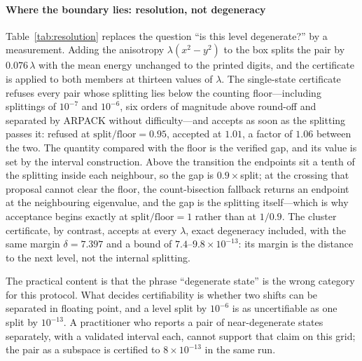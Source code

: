 \paragraph{Where the boundary lies: resolution, not degeneracy}
Table~\ref{tab:resolution} replaces the question ``is this level degenerate?''
by a measurement. Adding the anisotropy $\lambda(x^2-y^2)$ to the box splits
the pair by $0.076\,\lambda$ with the mean energy unchanged to the printed
digits, and the certificate is applied to both members at thirteen values of
$\lambda$. The single-state certificate refuses every pair whose splitting
lies below the counting floor---including splittings of $10^{-7}$ and
$10^{-6}$, six orders of magnitude above round-off and separated by ARPACK
without difficulty---and accepts as soon as the splitting passes it: refused
at $\text{split}/\text{floor}=0.95$, accepted at $1.01$, a factor of $1.06$
between the two. The quantity compared with the floor is the verified gap,
and its value is set by the interval construction. Above the transition the
endpoints sit a tenth of the splitting inside each neighbour, so the gap is
$0.9\times$split; at the crossing that proposal cannot clear the floor, the
count-bisection fallback returns an endpoint at the neighbouring eigenvalue,
and the gap is the splitting itself---which is why acceptance begins exactly
at $\text{split}/\text{floor}=1$ rather than at $1/0.9$. The cluster
certificate, by contrast, accepts at every $\lambda$, exact degeneracy
included, with the same margin $\delta=7.397$ and a bound of
$7.4$--$9.8\times10^{-13}$: its margin is the distance to the next level, not
the internal splitting.

The practical content is that the phrase ``degenerate state'' is the wrong
category for this protocol. What decides certifiability is whether two shifts
can be separated in floating point, and a level split by $10^{-6}$ is as
uncertifiable as one split by $10^{-13}$. A practitioner who reports a pair of
near-degenerate states separately, with a validated interval each, cannot
support that claim on this grid; the pair as a subspace is certified to
$8\times10^{-13}$ in the same run.

\begin{table}[t]
\centering

\caption{Resolution boundary on the $81\times81$ box perturbed by
$\lambda(x^2-y^2)$, which splits the level linearly with the mean energy
unchanged. ``floor'' is $10^{-9}s$ of \eqref{eq:floor}. The single-state
certificate accepts when the verified gap passes the floor; the gap is nine
tenths of the splitting above the transition and equal to it at the crossing,
so acceptance begins at $\text{split}/\text{floor}\approx1$. The cluster
certificate has no such transition. Widths are
omitted because the two-sided enclosure of an exact eigenvector is at the
round-off floor ($4.9\times10^{-11}$) in every accepted row.}
\label{tab:resolution}
\end{table}

